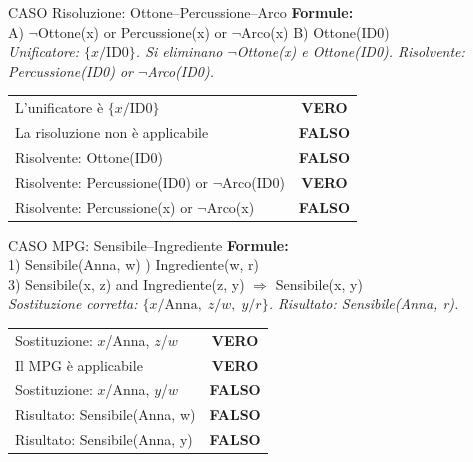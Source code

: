 \documentclass[12pt,a4paper]{article}
\newcommand{\V}{\textcolor{green!55!black}{\textbf{VERO}}}
\newcommand{\F}{\textcolor{red!65!black}{\textbf{FALSO}}}
\begin{document}
\vspace{6pt}

\begin{vftab}{CASO Risoluzione: Ottone--Percussione--Arco}
\textbf{Formule:}\\
A) $\neg$Ottone(x) or Percussione(x) or $\neg$Arco(x) \quad B) Ottone(ID0)\\[4pt]
\textit{Unificatore: $\{x/\text{ID0}\}$. Si eliminano $\neg$Ottone(x) e Ottone(ID0). Risolvente: Percussione(ID0) or $\neg$Arco(ID0).}
\begin{center}
\renewcommand{\arraystretch}{1.3}
\begin{tabular}{lc}
\hline
L'unificatore è $\{x/\text{ID0}\}$ & \V \\
La risoluzione non è applicabile & \F \\
Risolvente: Ottone(ID0) & \F \\
Risolvente: Percussione(ID0) or $\neg$Arco(ID0) & \V \\
Risolvente: Percussione(x) or $\neg$Arco(x) & \F \\
\hline
\end{tabular}
\end{center}
\end{vftab}

\vspace{6pt}

\begin{vftab}{CASO MPG: Sensibile--Ingrediente}
\textbf{Formule:}\\
1) Sensibile(Anna, w) ) Ingrediente(w, r)\\
3) Sensibile(x, z) and Ingrediente(z, y) $\Rightarrow$ Sensibile(x, y)\\[4pt]
\textit{Sostituzione corretta: $\{x/\text{Anna},\; z/w,\; y/r\}$. Risultato: Sensibile(Anna, r).}
\begin{center}
\renewcommand{\arraystretch}{1.3}
\begin{tabular}{lc}
\hline
Sostituzione: $x$/Anna, $z$/$w$ & \V \\
Il MPG è applicabile & \V \\
Sostituzione: $x$/Anna, $y$/$w$ & \F \\
Risultato: Sensibile(Anna, w) & \F \\
Risultato: Sensibile(Anna, y) & \F \\
\hline
\end{tabular}
\end{center}
\end{vftab}

\end{document}
